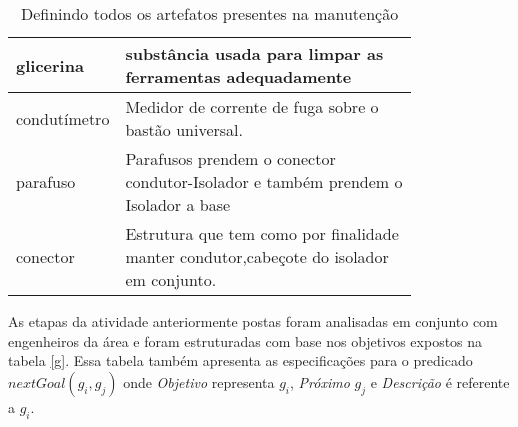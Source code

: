 \begin{table}[H]
\begin{tabular}{|l|p{0.8\linewidth}|}
glicerina & substância usada para limpar as ferramentas adequadamente \\ \hline
condutímetro & Medidor de corrente de fuga sobre o bastão universal. \\ \hline
parafuso & Parafusos prendem o conector condutor-Isolador e também prendem o Isolador a base \\ \hline
conector & Estrutura que tem como por finalidade manter condutor,cabeçote do isolador em conjunto. \\ \hline
\end{tabular}
\caption{Definindo todos os artefatos presentes na manutenção}
\label{artefacts}
\end{table} 

As etapas da atividade anteriormente postas foram analisadas em conjunto com engenheiros da área e foram estruturadas com base nos objetivos expostos na tabela \ref{g}. Essa tabela também apresenta as especificações para o predicado $nextGoal(g_i,g_j)$ onde \textit{Objetivo} representa $g_i$, \textit{Próximo} $g_j$ e \textit{Descrição} é referente a $g_i$.

